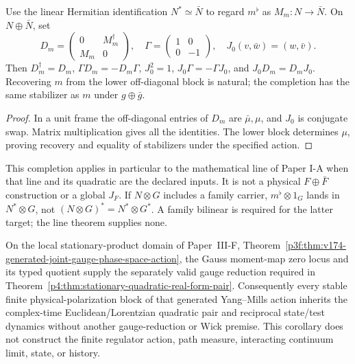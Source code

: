 \documentclass[12pt,a4paper]{article}
\begin{document}
\begin{proposition}
\label{p4:prop:faithful-conjugate-line-completion}
Use the linear Hermitian identification \(N^*\simeq\bar N\)
to regard \(m^\flat\) as \(M_m:N\to\bar N\).  On
\(N\oplus\bar N\), set
\[
 D_m=\begin{pmatrix}0&M_m^\dagger\\M_m&0\end{pmatrix},
 \quad \Gamma=\begin{pmatrix}1&0\\0&-1\end{pmatrix},
 \quad J_0(v,\bar w)=(w,\bar v).
\]
Then \(D_m^\dagger=D_m\), \(\Gamma D_m=-D_m\Gamma\),
\(J_0^2=1\), \(J_0\Gamma=-\Gamma J_0\), and \(J_0D_m=D_mJ_0\).
Recovering \(m\) from the lower off-diagonal block is natural;
the completion has the same stabilizer as \(m\) under
\(g\oplus\bar g\).
\end{proposition}
\begin{proof}
In a unit frame the off-diagonal entries of \(D_m\) are
\(\bar\mu,\mu\), and \(J_0\) is conjugate swap.
Matrix multiplication gives all the identities.  The lower
block determines \(\mu\), proving recovery and equality of
stabilizers under the specified action.
\end{proof}

This completion applies in particular to the mathematical line
of Paper I-A when that line and its quadratic are the declared
inputs.  It is not a physical \(F\oplus\bar F\) construction or
a global \(J_F\).  If \(N\otimes G\) includes a family carrier,
\(m^\flat\otimes1_G\) lands in \(N^*\otimes G\), not
\((N\otimes G)^*=N^*\otimes G^*\).  A family bilinear is required
for the latter target; the line theorem supplies none.




\begin{corollary}
\label{p4:cor:v174-yang-mills-reduction-real-form-domain}
On the local stationary-product domain of Paper~III-F,
Theorem~\ref{p3f:thm:v174-generated-joint-gauge-phase-space-action}, the
Gauss moment-map zero locus and its typed quotient supply the separately valid
gauge reduction required in
Theorem~\ref{p4:thm:stationary-quadratic-real-form-pair}.  Consequently every
stable finite physical-polarization block of that generated Yang--Mills action
inherits the complex-time Euclidean/Lorentzian quadratic pair and reciprocal
state/test dynamics without another gauge-reduction or Wick premise.  This
corollary does not construct the finite regulator action, path measure,
interacting continuum limit, state, or history.
\end{corollary}
\end{document}
